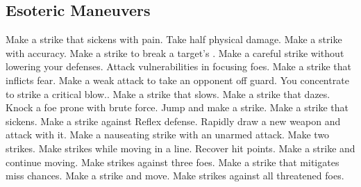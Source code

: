 
\small
\subsection{Esoteric Maneuvers}\label{Esoteric Maneuvers}
\begin{spelllist}
 Make a strike that sickens with pain.
 Take half physical damage.
 Make a strike with  accuracy.
 Make a strike to break a target's .
 Make a careful strike without lowering your defenses.
 Attack vulnerabilities in focusing foes.
 Make a strike that inflicts fear.
 Make a weak attack to take an opponent off guard.
 You concentrate to strike a critical blow..
 Make a strike that slows.
 Make a strike that dazes.
 Knock a foe prone with brute force.
 Jump and make a strike.
 Make a strike that sickens.
 Make a strike against Reflex defense.
 Rapidly draw a new weapon and attack with it.
 Make a nauseating strike with an unarmed attack.
 Make two strikes.
 Make strikes while moving in a line.
 Recover hit points.
 Make a strike and continue moving.
 Make strikes against three foes.
 Make a strike that mitigates miss chances.
 Make a strike and move.
 Make strikes against all threatened foes.
\end{spelllist}



\small
